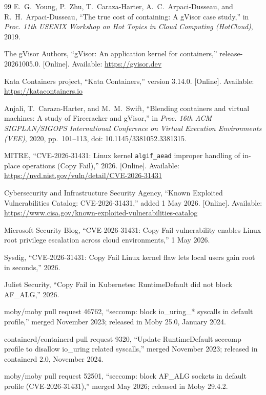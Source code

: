 \begin{thebibliography}{99}
 E.~G.~Young, P.~Zhu, T.~Caraza-Harter, A.~C.~Arpaci-Dusseau, and R.~H.~Arpaci-Dusseau, ``The true cost of containing: A gVisor case study,'' in \emph{Proc. 11th USENIX Workshop on Hot Topics in Cloud Computing (HotCloud)}, 2019.

 The gVisor Authors, ``gVisor: An application kernel for containers,'' release-20261005.0. [Online]. Available: \url{https://gvisor.dev}

 Kata Containers project, ``Kata Containers,'' version 3.14.0. [Online]. Available: \url{https://katacontainers.io}

 Anjali, T.~Caraza-Harter, and M.~M.~Swift, ``Blending containers and virtual machines: A study of Firecracker and gVisor,'' in \emph{Proc. 16th ACM SIGPLAN/SIGOPS International Conference on Virtual Execution Environments (VEE)}, 2020, pp.~101--113, doi: 10.1145/3381052.3381315.

 MITRE, ``CVE-2026-31431: Linux kernel \texttt{algif\_aead} improper handling of in-place operations (Copy Fail),'' 2026. [Online]. Available: \url{https://nvd.nist.gov/vuln/detail/CVE-2026-31431}

 Cybersecurity and Infrastructure Security Agency, ``Known Exploited Vulnerabilities Catalog: CVE-2026-31431,'' added 1 May 2026. [Online]. Available: \url{https://www.cisa.gov/known-exploited-vulnerabilities-catalog}

 Microsoft Security Blog, ``CVE-2026-31431: Copy Fail vulnerability enables Linux root privilege escalation across cloud environments,'' 1 May 2026.

 Sysdig, ``CVE-2026-31431: Copy Fail Linux kernel flaw lets local users gain root in seconds,'' 2026.

 Juliet Security, ``Copy Fail in Kubernetes: RuntimeDefault did not block AF\_ALG,'' 2026.

 moby/moby pull request 46762, ``seccomp: block io\_uring\_* syscalls in default profile,'' merged November 2023; released in Moby 25.0, January 2024.

 containerd/containerd pull request 9320, ``Update RuntimeDefault seccomp profile to disallow io\_uring related syscalls,'' merged November 2023; released in containerd 2.0, November 2024.

 moby/moby pull request 52501, ``seccomp: block AF\_ALG sockets in default profile (CVE-2026-31431),'' merged May 2026; released in Moby 29.4.2.


\end{thebibliography}
